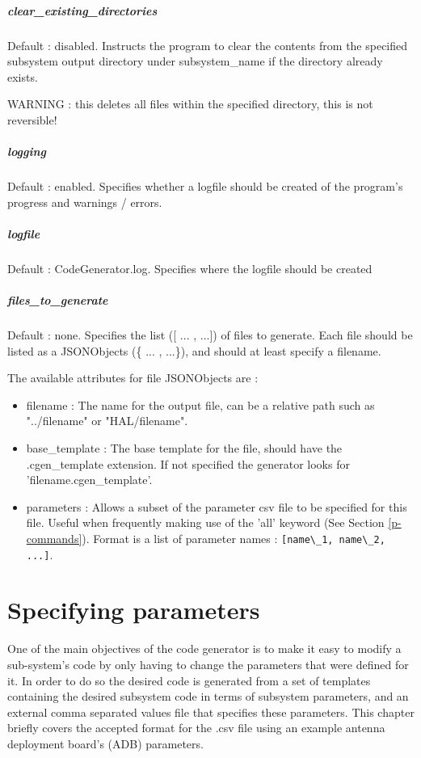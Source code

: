 \documentclass{settings/TU_Delft_Report}
\begin{document}
\paragraph{clear\_existing\_directories} Default : disabled. Instructs the program to clear the contents from the specified subsystem output directory under subsystem\_name if the directory already exists.

WARNING : this deletes all files within the specified directory, this is not reversible!

\paragraph{logging} Default : enabled. Specifies whether a logfile should be created of the program's progress and warnings / errors.
\paragraph{logfile} Default : CodeGenerator.log. Specifies where the logfile should be created

\paragraph{files\_to\_generate} Default : none. Specifies the list ([ ... , ...]) of files to generate. Each file should be listed as a JSONObjects (\{ ... , ...\}), and should at least specify a filename.

\vsp The available attributes for file JSONObjects are :
\begin{itemize}
    \item filename : The name for the output file, can be a relative path such as "../filename" or "HAL/filename".
    \item base\_template : The base template for the file, should have the .cgen\_template extension. If not specified the generator looks for 'filename.cgen\_template'.
    \item parameters : Allows a subset of the parameter csv file to be specified for this file. Useful when frequently making use of the 'all' keyword (See Section \ref{p-commands}). Format is a list of parameter names : \lstinline{[name\_1, name\_2, ...]}.
\end{itemize}




\chapter{Specifying parameters}
One of the main objectives of the code generator is to make it easy to modify a sub-system's code by only having to change the parameters that were defined for it. In order to do so the desired code is generated from a set of templates containing the desired subsystem code in terms of subsystem parameters, and an external comma separated values file that specifies these parameters. This chapter briefly covers the accepted format for the .csv file using an example antenna deployment board's (ADB) parameters.
\end{document}
